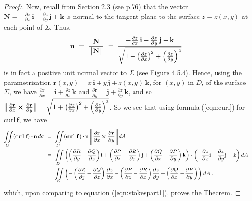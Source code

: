 \begin{proofbar}
\begin{proof}[Proof:]
 Now, recall from Section 2.3 (see p.76) that the vector $\textbf{N} = -\frac{\partial z}{\partial x}\,\textbf{i} -
 \frac{\partial z}{\partial y}\,\textbf{j} + \textbf{k}$ is normal to the tangent plane to the surface $z=z(x,y)$ at
 each point of $\Sigma$. Thus,
 \begin{displaymath}
  \textbf{n} ~=~ \frac{\textbf{N}}{\bigl\lVert\mspace{1mu}\textbf{N}\mspace{1mu}\bigr\rVert} ~=~
   \frac{-\frac{\partial z}{\partial x}\,\textbf{i} - \frac{\partial z}{\partial y}\,\textbf{j} +
   \textbf{k}}{\sqrt{1 + \left( \tfrac{\partial z}{\partial x} \right)^2 +
   \left( \tfrac{\partial z}{\partial y} \right)^2}}
 \end{displaymath}
 is in fact a positive unit normal vector to $\Sigma$ (see Figure 4.5.4). Hence, using the parametrization
 $\textbf{r}(x,y) = x\,\textbf{i} + y\,\textbf{j} + z(x,y)\,\textbf{k}$, for $(x,y)$ in $D$, of the surface $\Sigma$,
 we have $\frac{\partial \textbf{r}}{\partial x} = \textbf{i} + \frac{\partial z}{\partial x}\,\textbf{k}$ and
 $\frac{\partial \textbf{r}}{\partial y} = \textbf{j} + \frac{\partial z}{\partial y}\,\textbf{k}$, and so
 $\bigl\lVert\mspace{1mu}\frac{\partial \textbf{r}}{\partial x} \bm{\times} \frac{\partial \textbf{r}}{\partial y}\mspace{1mu}\bigr\rVert =
   \sqrt{1 + \left( \tfrac{\partial z}{\partial x} \right)^2 + \left( \tfrac{\partial z}{\partial y} \right)^2}$.
 So we see that using formula (\ref{eqn:curl}) for $\text{curl}~{\textbf{f}}$, we have
 \begin{align*}
  \iint\limits_{\Sigma} (\text{curl}~{\textbf{f}}) \bm{\cdot} \textbf{n}\,d\sigma ~&=~
   \iint\limits_{D} (\text{curl}~{\textbf{f}}\,) \bm{\cdot} \textbf{n}\,
   \Biggl\lVert\mspace{1mu}\frac{\partial \textbf{r}}{\partial x} \bm{\times} \frac{\partial \textbf{r}}{\partial y}\mspace{1mu}\Biggr\rVert\,dA\\
   &=~ \iint\limits_{D} \left( \left( \frac{\partial R}{\partial y} - \frac{\partial Q}{\partial z} \right)
    \textbf{i} + \left( \frac{\partial P}{\partial z} - \frac{\partial R}{\partial x} \right) \textbf{j} +
    \left( \frac{\partial Q}{\partial x} - \frac{\partial P}{\partial y} \right) \textbf{k}
    \right) \bm{\cdot} \left( -\frac{\partial z}{\partial x}\textbf{i} - \frac{\partial z}{\partial y}\textbf{j} +
    \textbf{k} \right) dA\\
   &=~ \iint\limits_{D} \left(
    -\left( \frac{\partial R}{\partial y} - \frac{\partial Q}{\partial z} \right) \frac{\partial z}{\partial x}
    -\left( \frac{\partial P}{\partial z} - \frac{\partial R}{\partial x} \right) \frac{\partial z}{\partial y}
    + \left( \frac{\partial Q}{\partial x} - \frac{\partial P}{\partial y} \right) \right)\,dA ~,
 \end{align*}
 which, upon comparing to equation (\ref{eqn:stokespart1}), proves the Theorem.
 \vspace{-3mm}
\end{proof}\end{proofbar}

